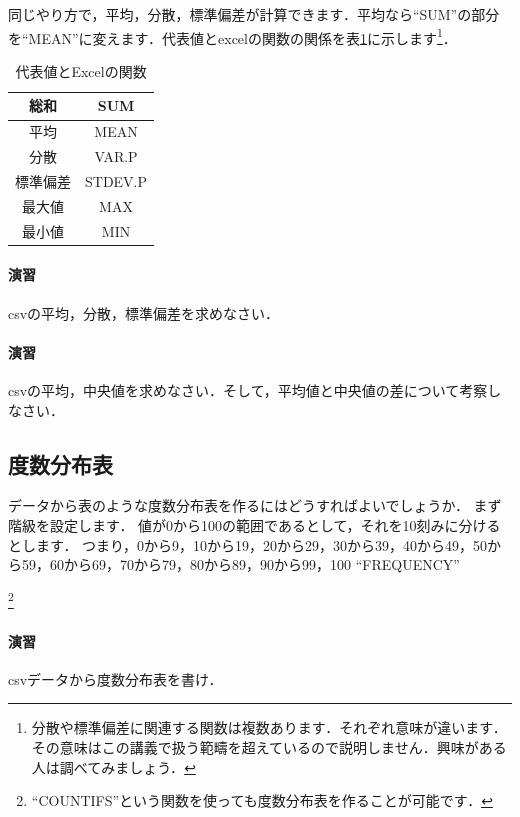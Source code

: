\documentclass[12pt, a4j]{jreport}
\begin{document}
同じやり方で，平均，分散，標準偏差が計算できます．平均なら``SUM''の部分を``MEAN''に変えます．代表値とexcelの関数の関係を表\ref{tab:funcs}に示します\footnote{分散や標準偏差に関連する関数は複数あります．それぞれ意味が違います．その意味はこの講義で扱う範疇を超えているので説明しません．興味がある人は調べてみましょう．}．

\begin{table}[htb]
    \centering
    \caption{代表値とExcelの関数}
    \begin{tabular}{|c|c|}
      \hline
      総和 & SUM\\ \hline
      平均 & MEAN\\ \hline
      分散 & VAR.P\\ \hline
      標準偏差 & STDEV.P \\ \hline
      最大値 & MAX \\ \hline
      最小値 & MIN \\ \hline
    \end{tabular}
    \label{tab:funcs}
\end{table}

\paragraph{演習}
csvの平均，分散，標準偏差を求めなさい．

\paragraph{演習}
csvの平均，中央値を求めなさい．そして，平均値と中央値の差について考察しなさい．

\subsection{度数分布表}
\label{sec:hist}

データから表のような度数分布表を作るにはどうすればよいでしょうか．
まず階級を設定します．
値が0から100の範囲であるとして，それを10刻みに分けるとします．
つまり，0から9，10から19，20から29，30から39，40から49，50から59，60から69，70から79，80から89，90から99，100
``FREQUENCY''

\footnote{``COUNTIFS''という関数を使っても度数分布表を作ることが可能です．}

\paragraph{演習}
csvデータから度数分布表を書け．
\end{document}
